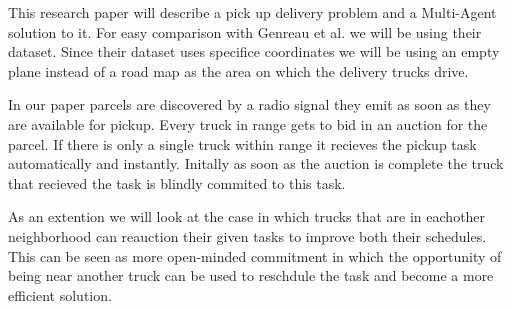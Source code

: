 \documentclass[../main.tex]{subfiles}
\begin{document}
This research paper will describe a pick up delivery problem and a Multi-Agent solution to it.
For easy comparison with Genreau et al. we will be using their dataset.
Since their dataset uses specifice coordinates we will be using an empty plane instead of a road map as the area on which the delivery trucks drive.

In our paper parcels are discovered by a radio signal they emit as soon as they are available for pickup.
Every truck in range gets to bid in an auction for the parcel. 
If there is only a single truck within range it recieves the pickup task automatically and instantly.
Initally as soon as the auction is complete the truck that recieved the task is blindly commited to this task. 

As an extention we will look at the case in which trucks that are in eachother neighborhood can reauction their given tasks to improve both their schedules.
This can be seen as more open-minded commitment in which the opportunity of being near another truck can be used to reschdule the task and become a more efficient solution.
\end{document}
